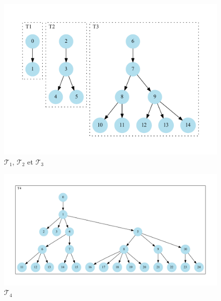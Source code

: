 \begin{frame}
\begin{figure}
\includegraphics[scale=0.5]{./images/t1_2_3}
\caption{$\mathcal{T}_1$, $\mathcal{T}_2$ et $\mathcal{T}_3$}
\end{figure}
\end{frame}

\begin{frame}
\begin{figure}
\includegraphics[scale=0.4]{./images/t4}
\caption{$\mathcal{T}_4$}
\end{figure}
\end{frame}

